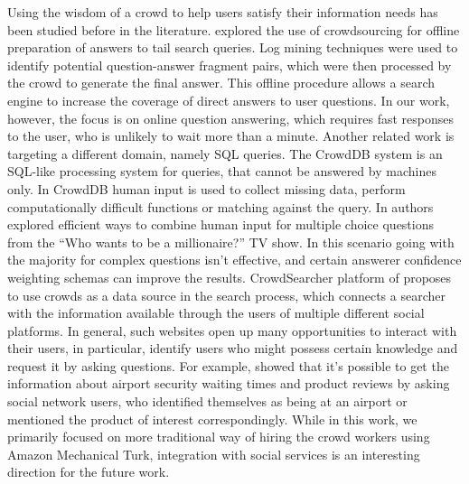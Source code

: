 \documentclass[letterpaper]{article}
\begin{document}
Using the wisdom of a crowd to help users satisfy their information needs has been studied before in the literature.
\cite{bernstein2012direct} explored the use of crowdsourcing for offline preparation of answers to tail search queries.
Log mining techniques were used to identify potential question-answer fragment pairs, which were then processed by the crowd to generate the final answer.
This offline procedure allows a search engine to increase the coverage of direct answers to user questions.
In our work, however, the focus is on online question answering, which requires fast responses to the user, who is unlikely to wait more than a minute.
Another related work is targeting a different domain, namely SQL queries.
The CrowdDB system \cite{franklin2011crowddb} is an SQL-like processing system for queries, that cannot be answered by machines only.
In CrowdDB human input is used to collect missing data, perform computationally difficult functions or matching against the query.
In \cite{aydin2014crowdsourcing} authors explored efficient ways to combine human input for multiple choice questions from the ``Who wants to be a millionaire?'' TV show.
In this scenario going with the majority for complex questions isn't effective, and certain answerer confidence weighting schemas can improve the results.  
CrowdSearcher platform of \cite{Bozzon:2012:ASQ:2187836.2187971} proposes to use crowds as a data source in the search process, which connects a searcher with the information available through the users of multiple different social platforms.
In general, such websites open up many opportunities to interact with their users, in particular, identify users who might possess certain knowledge and request it by asking questions.
For example, \cite{nichols2012asking,nichols2013analyzing,mahmud2013recommending} showed that it's possible to get the information about airport security waiting times and product reviews by asking social network users, who identified themselves as being at an airport or mentioned the product of interest correspondingly.
While in this work, we primarily focused on more traditional way of hiring the crowd workers using Amazon Mechanical Turk, integration with social services is an interesting direction for the future work.
\end{document}
